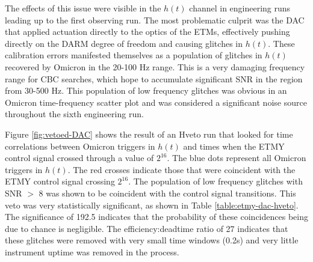 The effects of this issue were visible in the $h(t)$ channel in engineering 
runs leading up to the first observing run. 
The most problematic culprit was the DAC that applied actuation directly 
to the optics of the ETMs, effectively pushing directly on the DARM degree 
of freedom and causing glitches in $h(t)$. These calibration errors manifested 
themselves as a population of glitches in $h(t)$ recovered by Omicron in the 
20-100 Hz range. This is a very damaging frequency range for CBC searches, 
which hope to accumulate significant SNR in the region from 30-500 Hz.  
This population of low frequency glitches was obvious in an Omicron 
time-frequency scatter plot and was considered a significant noise source 
throughout the sixth engineering run.

Figure \ref{fig:vetoed-DAC} shows the result of an Hveto run that looked 
for time correlations between Omicron triggers in $h(t)$ and times when 
the ETMY control signal crossed through a value of $2^{16}$. The blue dots 
represent all Omicron triggers in $h(t)$. The red crosses indicate those 
that were coincident with the ETMY control signal crossing $2^{16}$. The 
population of low frequency glitches with SNR $>$ 8 was shown to be 
coincident with the control signal transitions. This veto 
was very statistically significant, as shown in Table \ref{table:etmy-dac-hveto}. 
The significance 
of 192.5 indicates that the probability of these coincidences being due 
to chance is negligible. The efficiency:deadtime ratio of 27 indicates 
that these glitches were removed with very small time windows (0.2s) 
and very little instrument uptime was removed in the process.

